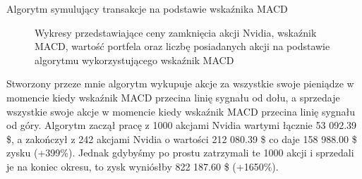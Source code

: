 \documentclass{article}
\begin{document}
\begin{section}{Algorytm symulujący transakcje na podstawie wskaźnika MACD}
\begin{figure}[H]
        \caption{Wykresy przedstawiające ceny zamknięcia akcji Nvidia, wskaźnik MACD, wartość portfela oraz liczbę posiadanych akcji na podstawie algorytmu wykorzystującego wskaźnik MACD}
    \end{figure}
    Stworzony przeze mnie algorytm wykupuje akcje za wszystkie swoje pieniądze w momencie kiedy wskaźnik MACD przecina linię sygnału od dołu, 
    a sprzedaje wszystkie swoje akcje w momencie kiedy wskaźnik MACD przecina linię sygnału od góry.
    Algorytm zaczął pracę z 1000 akcjami Nvidia wartymi łącznie 53 092.39 \$, a zakończył z 242 akcjami Nvidia o wartości 212 080.39 \$ co daje 158 988.00 \$ zysku (+399\%).
    Jednak gdybyśmy po prostu zatrzymali te 1000 akcji i sprzedali je na koniec okresu, to zysk wyniósłby 822 187.60 \$ (+1650\%).
\end{section}
\end{document}
